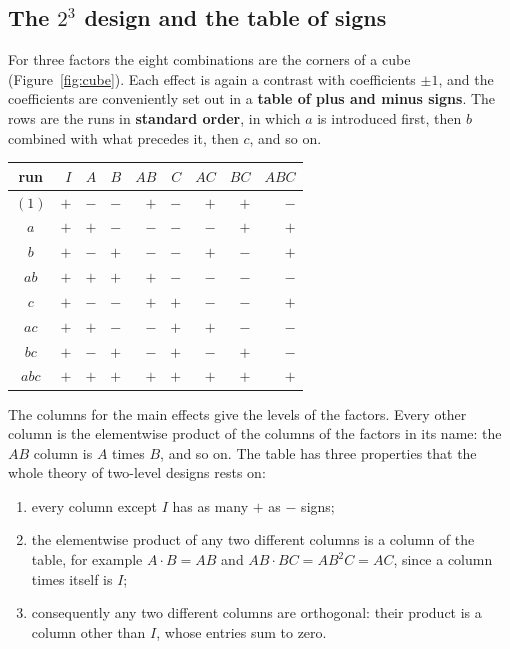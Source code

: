 \documentclass[11pt,a4paper]{article}
\numberwithin{equation}{section}
\theoremstyle{definition}
\begin{document}
\subsection{The $2^3$ design and the table of signs}
For three factors the eight combinations are the corners of a cube (Figure~\ref{fig:cube}). Each effect is again a contrast with coefficients $\pm1$,
and the coefficients are conveniently set out in a \textbf{table of plus and minus signs}. The rows are the runs in \textbf{standard order}, in which $a$ is
introduced first, then $b$ combined with what precedes it, then $c$, and so on.

\begin{center}
\begin{tabular}{c|r|rrrrrrr}
run & $I$ & $A$ & $B$ & $AB$ & $C$ & $AC$ & $BC$ & $ABC$ \\
\hline
$(1)$ & $+$ & $-$ & $-$ & $+$ & $-$ & $+$ & $+$ & $-$ \\
$a$ & $+$ & $+$ & $-$ & $-$ & $-$ & $-$ & $+$ & $+$ \\
$b$ & $+$ & $-$ & $+$ & $-$ & $-$ & $+$ & $-$ & $+$ \\
$ab$ & $+$ & $+$ & $+$ & $+$ & $-$ & $-$ & $-$ & $-$ \\
$c$ & $+$ & $-$ & $-$ & $+$ & $+$ & $-$ & $-$ & $+$ \\
$ac$ & $+$ & $+$ & $-$ & $-$ & $+$ & $+$ & $-$ & $-$ \\
$bc$ & $+$ & $-$ & $+$ & $-$ & $+$ & $-$ & $+$ & $-$ \\
$abc$ & $+$ & $+$ & $+$ & $+$ & $+$ & $+$ & $+$ & $+$
\end{tabular}
\end{center}

The columns for the main effects give the levels of the factors. Every other column is the elementwise product of the columns of the factors in
its name: the $AB$ column is $A$ times $B$, and so on. The table has three properties that the whole theory of two-level designs rests on:
\begin{enumerate}[label=(\roman*)]
\item every column except $I$ has as many $+$ as $-$ signs;
\item the elementwise product of any two different columns is a column of the table, for example $A \cdot B = AB$ and $AB \cdot BC = AB^2C = AC$, since a
column times itself is $I$;
\item consequently any two different columns are orthogonal: their product is a column other than $I$, whose entries sum to zero.
\end{enumerate}
\end{document}
